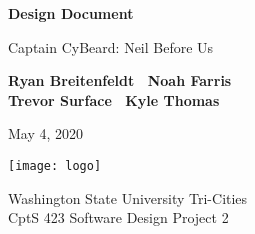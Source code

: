 \begin{titlepage}
    \begin{center}
        \vspace*{1cm}

        \Huge
        \textbf{Design Document}

        \vspace{.5cm}
        \LARGE
        Captain CyBeard: Neil Before Us

        \vspace{1cm}

        \textbf{Ryan Breitenfeldt \textbar\ Noah Farris\\ Trevor Surface \textbar\ Kyle Thomas}

        \vspace{.2cm}
        \Large
        May 4, 2020

        \vspace{2cm}
        \texttt{[image: logo]}

        \vfill

        Washington State University Tri-Cities\\
        CptS 423 Software Design Project 2

    \end{center}
\end{titlepage}

